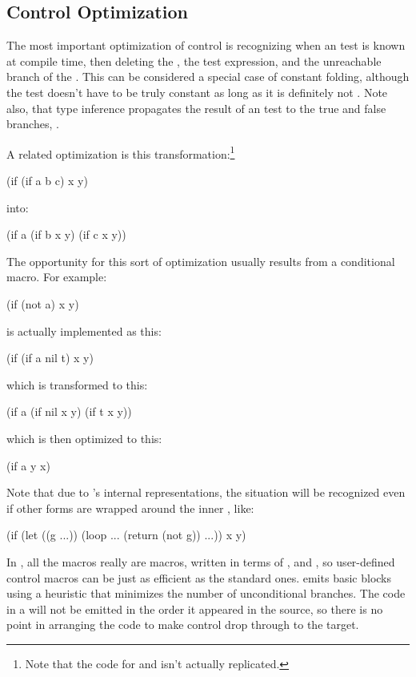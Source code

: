 \subsection{Control Optimization}

The most important optimization of control is recognizing when an
 test is known at compile time, then deleting the
, the test expression, and the unreachable branch of the
.  This can be considered a special case of constant folding,
although the test doesn't have to be truly constant as long as it is
definitely not \false.  Note also, that type inference propagates the
result of an  test to the true and false branches,
.

A related  optimization is this transformation:\footnote{Note
  that the code for  and  isn't actually replicated.}
\begin{lisp}
(if (if a b c) x y)
\end{lisp}
into:
\begin{lisp}
(if a
    (if b x y)
    (if c x y))
\end{lisp}
The opportunity for this sort of optimization usually results from a
conditional macro.  For example:
\begin{lisp}
(if (not a) x y)
\end{lisp}
is actually implemented as this:
\begin{lisp}
(if (if a nil t) x y)
\end{lisp}
which is transformed to this:
\begin{lisp}
(if a
    (if nil x y)
    (if t x y))
\end{lisp}
which is then optimized to this:
\begin{lisp}
(if a y x)
\end{lisp}
Note that due to \python{}'s internal representations, the
\dash{} situation will be recognized even if other
forms are wrapped around the inner , like:
\begin{example}
(if (let ((g ...))
      (loop
        ...
        (return (not g))
        ...))
    x y)
\end{example}

In \python, all the \clisp{} macros really are macros, written in
terms of ,  and , so user-defined
control macros can be just as efficient as the standard ones.
\python{} emits basic blocks using a heuristic that minimizes the
number of unconditional branches.  The code in a  will
not be emitted in the order it appeared in the source, so there is no
point in arranging the code to make control drop through to the
target.


